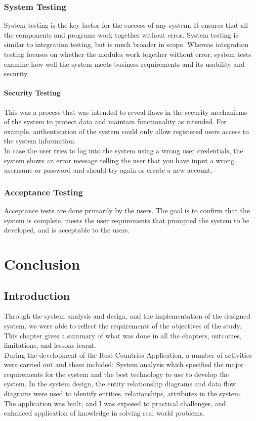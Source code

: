 \documentclass[twoside, a4paper, 12pt]{report}
\begin{document}
\subsection{System Testing}
System testing is the key factor for the success of any system. It ensures that all the components and programs work together without error. System testing is similar to integration testing, but is much broader in scope. Whereas integration testing focuses on whether the modules work together without error, system tests examine how well the system meets business requirements and its usability and security.

\subsubsection{Security Testing}
This was a process that was intended to reveal flaws in the security mechanisms of the system to protect data and maintain functionality as intended. For example, authentication of the system could only allow registered users access to the system information.\\
\indent
In case the user tries to log into the system using a wrong user credentials, the system shows an error message telling the user that you have input a wrong username or password and should try again or create a new account.

\subsection{Acceptance Testing}
Acceptance tests are done primarily by the users. The goal is to confirm that the system is complete, meets the user requirements that prompted the system to be developed, and is acceptable to the users.

\chapter{Conclusion}
\section{Introduction}
Through the system analysis and design, and the implementation of the designed system, we were able to reflect the requirements of the objectives of the study.
This chapter gives a summary of what was done in all the chapters, outcomes, limitations, and lessons learnt.\\
\indent
During the development of the Rest Countries Application, a number of activities were carried out and these included;
System analysis which specified the major requirements for the system and the best technology to use to develop the system.
In the system design, the entity relationship diagrams and data flow diagrams were used to identify entities, relationships, attributes in the system.\\
\indent
The application was built, and I was exposed to practical challenges, and enhanced application of knowledge in solving real world problems.
\end{document}
